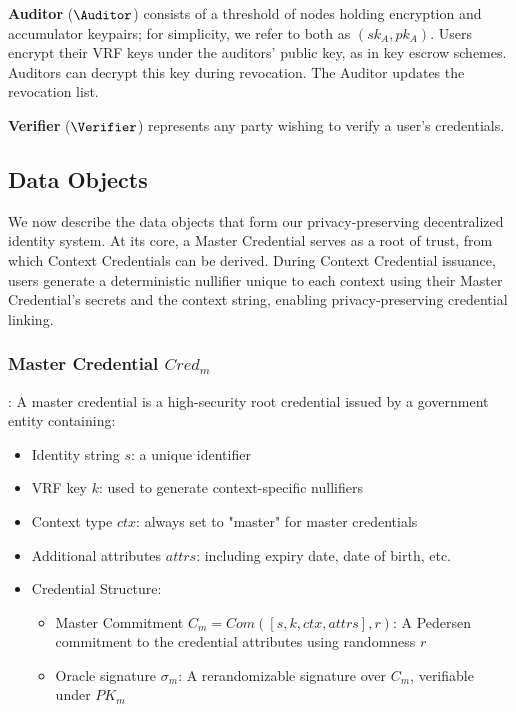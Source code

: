 \noindent \textbf{Auditor} ($\Auditor$) consists of a threshold of nodes holding encryption and accumulator keypairs; for simplicity, we refer to both as $(sk_A, pk_A)$. Users encrypt their VRF keys under the auditors' public key, as in key escrow schemes. Auditors can decrypt this key during revocation. The Auditor updates the revocation list. 

\noindent \textbf{Verifier} ($\Verifier$) represents any party wishing to verify a user's credentials.

\subsection{Data Objects}

We now describe the data objects that form our privacy-preserving decentralized identity system. At its core, a Master Credential serves as a root of trust, from which Context Credentials can be derived. During Context Credential issuance, users generate a deterministic nullifier unique to each context using their Master Credential's secrets and the context string, enabling privacy-preserving credential linking.

\subsubsection{Master Credential $Cred_m$}: 
A master credential is a high-security root credential issued by a government entity containing:

\begin{itemize}
    \item Identity string $s$: a unique identifier
    \item VRF key $k$: used to generate context-specific nullifiers
    \item Context type $ctx$: always set to "master" for master credentials
    \item Additional attributes $attrs$: including expiry date, date of birth, etc.
    \item Credential Structure:
    \begin{itemize}
        \item Master Commitment $C_m = Com([s, k, ctx, attrs],r)$: A Pedersen commitment to the credential attributes using randomness $r$
        \item Oracle signature $\sigma_m$: A rerandomizable signature over $C_m$, verifiable under $PK_m$
    \end{itemize}
\end{itemize}

